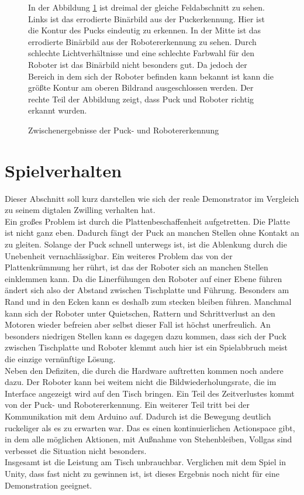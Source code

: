 \begin{figure} [h]
 \caption{Zwischenergebnisse der Puck- und Robotererkennung}
 \label{bv_process}
\vspace{5pt}
In der Abbildung \ref{bv_process} ist dreimal der gleiche Feldabschnitt zu sehen. Links ist das errodierte Binärbild aus der Puckerkennung. Hier ist die Kontur des Pucks eindeutig zu erkennen. In der Mitte ist das errodierte Binärbild aus der Robotererkennung zu sehen. Durch schlechte Lichtverhältnisse und eine schlechte Farbwahl für den Roboter ist das Binärbild nicht besonders gut. Da jedoch der Bereich in dem sich der Roboter befinden kann bekannt ist kann die größte Kontur am oberen Bildrand ausgeschlossen werden. Der rechte Teil der Abbildung zeigt, dass Puck und Roboter richtig erkannt wurden.
\end{figure}

\clearpage
\section{Spielverhalten}
\label{sect:verh}
Dieser Abschnitt soll kurz darstellen wie sich der reale Demonstrator im Vergleich zu seinem digtalen Zwilling verhalten hat.\\
Ein großes Problem ist durch die Plattenbeschaffenheit aufgetretten. Die Platte ist nicht ganz eben. Dadurch fängt der Puck an manchen Stellen ohne Kontakt an zu gleiten. Solange der Puck schnell unterwegs ist, ist die Ablenkung durch die Unebenheit vernachlässigbar. Ein weiteres Problem das von der Plattenkrümmung her rührt, ist das der Roboter sich an manchen Stellen einklemmen kann. Da die Linerfühungen den Roboter auf einer Ebene führen ändert sich also der Abstand zwischen Tischplatte und Führung. Besonders am Rand und in den Ecken kann es deshalb zum stecken bleiben führen. Manchmal kann sich der Roboter unter Quietschen, Rattern und Schrittverlust an den Motoren wieder befreien aber selbst dieser Fall ist höchst unerfreulich. An besonders niedrigen Stellen kann es dagegen dazu kommen, dass sich der Puck zwischen Tischplatte und Roboter klemmt auch hier ist ein Spielabbruch meist die einzige vernünftige Lösung.\\
Neben den Defiziten, die durch die Hardware auftretten kommen noch andere dazu. Der Roboter kann bei weitem nicht die Bildwiederholungsrate, die im Interface angezeigt wird auf den Tisch bringen. Ein Teil des Zeitverlustes kommt von der Puck- und Robotererkennung. Ein weiterer Teil tritt bei der Kommunikation mit dem Arduino auf. Dadurch ist die Bewegung deutlich ruckeliger als es zu erwarten war. Das es einen kontinuierlichen Actionspace gibt, in dem alle möglichen Aktionen, mit Außnahme von Stehenbleiben, Vollgas sind verbesset die Situation nicht besonders.\\
Insgesamt ist die Leistung am Tisch unbrauchbar. Verglichen mit dem Spiel in Unity, dass fast nicht zu gewinnen ist, ist dieses Ergebnis noch nicht für eine Demonstration geeignet.
